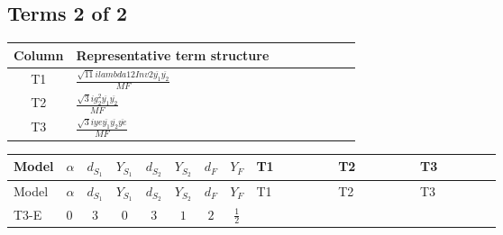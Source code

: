 \documentclass[8pt]{article}
\begin{document}
\begin{landscape}
\subsection*{Terms 2 of 2}
\begin{center}
\begin{tabular}{@{}c >{\raggedright\arraybackslash}p{0.82\linewidth}@{}}
\toprule
Column & Representative term structure \\
\midrule
T1 & \(\displaystyle \frac{\sqrt{11} i lambda12Inv2 \overline{y_{1}} \overline{y_{2}}}{MF}\) \\
\midrule
T2 & \(\displaystyle \frac{\sqrt{3} i g_{2}^{2} \overline{y_{1}} \overline{y_{2}}}{MF}\) \\
\midrule
T3 & \(\displaystyle \frac{\sqrt{3} i ye \overline{y_{1}} \overline{y_{2}} \overline{ye}}{MF}\) \\
\midrule
\bottomrule
\end{tabular}
\end{center}
\smallskip
\tiny
\begin{longtable}{@{}llcccccc >{\raggedright\arraybackslash}p{0.21\linewidth} >{\raggedright\arraybackslash}p{0.21\linewidth} >{\raggedright\arraybackslash}p{0.21\linewidth}@{}}
\toprule
Model & $\alpha$ & $d_{S_1}$ & $Y_{S_1}$ & $d_{S_2}$ & $Y_{S_2}$ & $d_F$ & $Y_F$ & T1 & T2 & T3 \\
\midrule
\endfirsthead
\toprule
Model & $\alpha$ & $d_{S_1}$ & $Y_{S_1}$ & $d_{S_2}$ & $Y_{S_2}$ & $d_F$ & $Y_F$ & T1 & T2 & T3 \\
\midrule
\endhead
T3-E & $0$ & $3$ & $0$ & $3$ & $1$ & $2$ & $\frac{1}{2}$ & \scriptsize\adjustbox{max width=\linewidth}{$\begin{gathered} \frac{3 \sqrt{11} i lambda12Inv2 \overline{y_{1}} \overline{y_{2}}}{22 MF}\end{gathered}$} & \scriptsize\adjustbox{max width=\linewidth}{$\begin{gathered} \frac{11 \sqrt{3} i g_{2}^{2} \overline{y_{1}} \overline{y_{2}}}{8 MF}\end{gathered}$} & \scriptsize\adjustbox{max width=\linewidth}{$\begin{gathered} - \frac{\sqrt{3} i ye \overline{y_{1}} \overline{y_{2}} \overline{ye}}{12 MF}\end{gathered}$} \\
\midrule
\bottomrule
\end{longtable}
\end{landscape}
\end{document}
